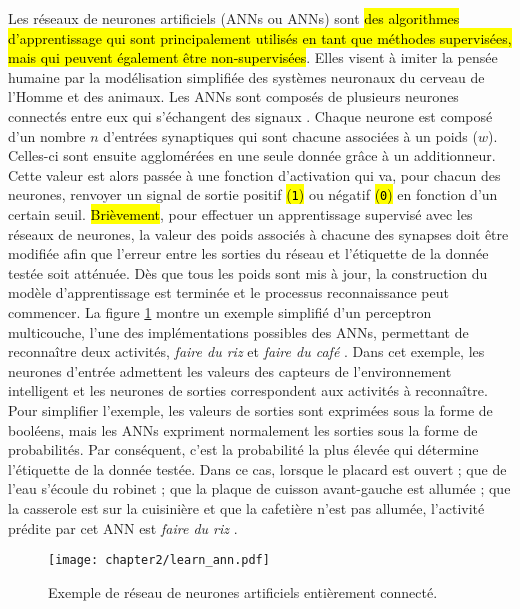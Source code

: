 Les réseaux de neurones artificiels (\aclp{ANN} ou \acsp{ANN}) sont \hl{des algorithmes d'apprentissage qui sont principalement utilisés en tant que méthodes supervisées, mais qui peuvent également être non-supervisées}. Elles visent à imiter la pensée humaine par la modélisation simplifiée des systèmes neuronaux du cerveau de l'Homme et des animaux. Les \acsp{ANN} sont composés de plusieurs neurones connectés entre eux qui s'échangent des signaux \citep{Witten2016}. Chaque neurone est composé d'un nombre $n$ d'entrées synaptiques qui sont chacune associées à un poids ($w$). Celles-ci sont ensuite agglomérées en une seule donnée grâce à un additionneur. Cette valeur est alors passée à une fonction d'activation qui va, pour chacun des neurones, renvoyer un signal de sortie positif \hl{(\texttt{1})} ou négatif \hl{(\texttt{0})} en fonction d'un certain seuil. \hl{Brièvement}, pour effectuer un apprentissage supervisé avec les réseaux de neurones, la valeur des poids associés à chacune des synapses doit être modifiée afin que l'erreur entre les sorties du réseau et l'étiquette de la donnée testée soit atténuée. Dès que tous les poids sont mis à jour, la construction du modèle d'apprentissage est terminée et le processus reconnaissance peut commencer. La figure \ref{fig:learn_ann} montre un exemple simplifié d'un perceptron multicouche, l'une des implémentations possibles des \acsp{ANN}, permettant de reconnaître deux activités, \og \textit{faire du riz} \fg et \og \textit{faire du café} \fg. Dans cet exemple, les neurones d'entrée admettent les valeurs des capteurs de l'environnement intelligent et les neurones de sorties correspondent aux activités à reconnaître. Pour simplifier l'exemple, les valeurs de sorties sont exprimées sous la forme de booléens, mais les \acsp{ANN} expriment normalement les sorties sous la forme de probabilités. Par conséquent, c'est la probabilité la plus élevée qui détermine l'étiquette de la donnée testée. Dans ce cas, lorsque le placard est ouvert ; que de l'eau s'écoule du robinet ; que la plaque de cuisson avant-gauche est allumée ; que la casserole est sur la cuisinière et que la cafetière n'est pas allumée, l'activité prédite par cet \acs{ANN} est \og \textit{faire du riz} \fg.

\begin{figure}[H]
	\centering
	\texttt{[image: chapter2/learn\_ann.pdf]}
	\caption{Exemple de réseau de neurones artificiels entièrement connecté.}
	\label{fig:learn_ann}
\end{figure}

